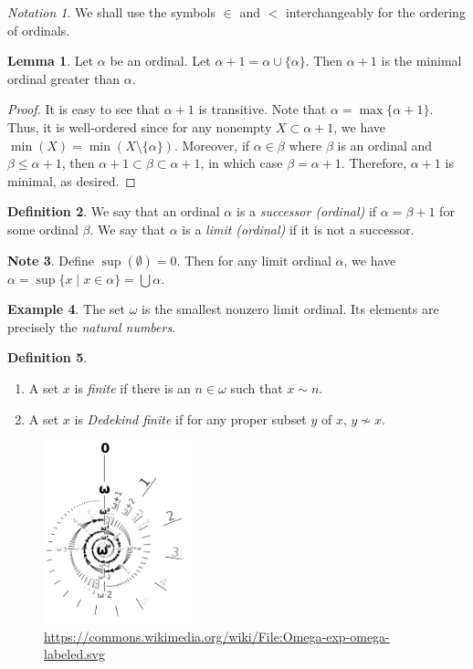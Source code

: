 \documentclass[10pt,letterpaper,cm]{nupset}
\theoremstyle{definition}
\newtheorem{definition}{Definition}[subsection]
\newtheorem{exmp}[definition]{Example}
\newtheorem{note}[definition]{Note}
\theoremstyle{theorem}
\newtheorem{lemma}[definition]{Lemma}
\theoremstyle{remark}
\newtheorem*{notation}{Notation}
\newcommand{\1}{\mathbf{1}}
\newcommand{\0}{\vec 0}
\begin{document}
\begin{notation}
We shall use the symbols $\in$ and $<$ interchangeably for the ordering of ordinals. 
\end{notation}

\pagebreak

\begin{lemma}
Let $\alpha$ be an ordinal. Let $\alpha +1 = \alpha \cup \{\alpha \}$. Then $\alpha +1$ is the minimal ordinal greater than $\alpha$. 
\end{lemma}
\begin{proof}
It is easy to see that $\alpha +1$ is transitive. Note that $\alpha  = \max\{\alpha +1\}$. Thus, it is well-ordered since for any nonempty $X \subset \alpha +1$, we have $\min(X) = \min(X \setminus \{\alpha \})$. Moreover, if $\alpha \in \beta$ where $\beta$ is an ordinal and $\beta \leq \alpha +1$, then $\alpha + 1 \subset \beta \subset \alpha +1$, in which case $\beta = \alpha +1$. Therefore, $\alpha +1$ is minimal, as desired. 
\end{proof}

\begin{definition}
We say that an ordinal $\alpha$ is a \textit{successor (ordinal)} if $\alpha = \beta +1$ for some ordinal $\beta$. We say that $\alpha$ is a \textit{limit (ordinal)} if it is not a successor.
\end{definition}

\begin{note}
Define $\sup(\emptyset) = 0$. Then for any limit ordinal $\alpha$, we have $\alpha = \sup\{x\mid x \in \alpha\} = \bigcup{\alpha}.$
\end{note}

\begin{exmp}
The set $\omega$ is  the smallest nonzero limit ordinal. Its elements are precisely the \textit{natural numbers}.
\end{exmp}

\begin{definition} $ $
\begin{enumerate}
\item A set $x$ is \textit{finite}  if there is an $n \in \omega$ such that $x \sim n$.
\item A set $x$ is \textit{Dedekind finite} if for any proper subset $y$ of $x$, $y \not \sim x$.
\end{enumerate}
\end{definition}

\begin{figure}[H]
\centering
\includegraphics[width=43mm]{ordinal-spiral.png}
\caption{\url{https://commons.wikimedia.org/wiki/File:Omega-exp-omega-labeled.svg}}
\end{figure}
\end{document}

